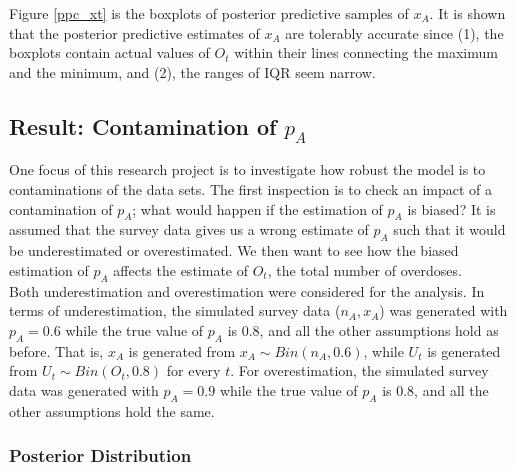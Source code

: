 \documentclass[12pt]{article}
\begin{document}
{\begin{figure}[htb]
\end{figure}

Figure \ref{ppc_xt} is the boxplots of posterior predictive samples of $x_A$. It is shown that the posterior predictive estimates of $x_A$ are tolerably accurate since (1), the boxplots contain actual values of $O_t$ within their lines connecting the maximum and the minimum, and (2), the ranges of IQR seem narrow. \\



\subsection{Result: Contamination of $p_A$ } 
One focus of this research project is to investigate how robust the model is to contaminations of the data sets. The first inspection is to check an impact of a contamination of $p_A$; what would happen if the estimation of $p_A$ is biased? It is assumed that the survey data gives us a wrong estimate of $p_A$ such that it would be underestimated or overestimated. We then want to see how the biased estimation of $p_A$ affects the estimate of $O_t$, the total number of overdoses.\\

Both underestimation and overestimation were considered for the analysis. In terms of underestimation, the simulated survey data ($n_A, x_A$) was generated with $p_A=0.6$ while the true value of $p_A$ is 0.8, and all the other assumptions hold as before. That is, $x_A$ is generated from $x_A \sim Bin(n_A, 0.6)$, while $U_t$ is generated from $U_t \sim Bin(O_t, 0.8)$ for every $t$. For overestimation, the simulated survey data was generated with $p_A=0.9$ while the true value of $p_A$ is 0.8, and all the other assumptions hold the same.  \\

\subsubsection{Posterior Distribution}

}
\end{document}
